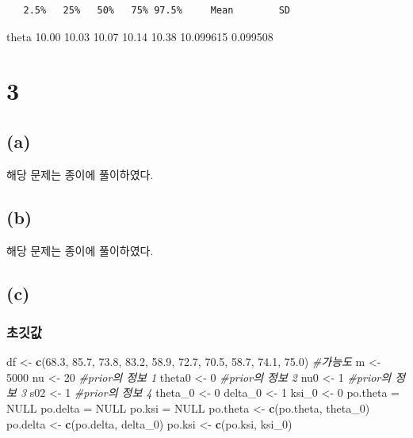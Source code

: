 \documentclass[
]{article}
\newenvironment{Shaded}{\begin{snugshade}}{\end{snugshade}}
\newcommand{\CommentTok}[1]{\textcolor[rgb]{0.56,0.35,0.01}{\textit{#1}}}
\newcommand{\ConstantTok}[1]{\textcolor[rgb]{0.56,0.35,0.01}{#1}}
\newcommand{\DecValTok}[1]{\textcolor[rgb]{0.00,0.00,0.81}{#1}}
\newcommand{\FloatTok}[1]{\textcolor[rgb]{0.00,0.00,0.81}{#1}}
\newcommand{\FunctionTok}[1]{\textcolor[rgb]{0.13,0.29,0.53}{\textbf{#1}}}
\newcommand{\NormalTok}[1]{#1}
\newcommand{\OtherTok}[1]{\textcolor[rgb]{0.56,0.35,0.01}{#1}}
\begin{document}
\begin{verbatim}
   2.5%   25%   50%   75% 97.5%     Mean        SD
\end{verbatim}

theta 10.00 10.03 10.07 10.14 10.38 10.099615 0.099508

\section{3}\label{section-3}

\subsection{(a)}\label{a-3}

해당 문제는 종이에 풀이하였다.

\subsection{(b)}\label{b-3}

해당 문제는 종이에 풀이하였다.

\subsection{(c)}\label{c-3}

\subsubsection{초깃값}\label{uxcd08uxae43uxac12}

\begin{Shaded}
\begin{Highlighting}[]
\NormalTok{df }\OtherTok{\textless{}{-}} \FunctionTok{c}\NormalTok{(}\FloatTok{68.3}\NormalTok{, }\FloatTok{85.7}\NormalTok{, }\FloatTok{73.8}\NormalTok{, }\FloatTok{83.2}\NormalTok{, }\FloatTok{58.9}\NormalTok{, }\FloatTok{72.7}\NormalTok{, }\FloatTok{70.5}\NormalTok{, }\FloatTok{58.7}\NormalTok{, }\FloatTok{74.1}\NormalTok{, }\FloatTok{75.0}\NormalTok{) }\CommentTok{\#가능도}
\NormalTok{m }\OtherTok{\textless{}{-}} \DecValTok{5000}
\NormalTok{nu }\OtherTok{\textless{}{-}} \DecValTok{20} \CommentTok{\#prior의 정보 1}
\NormalTok{theta0 }\OtherTok{\textless{}{-}} \DecValTok{0} \CommentTok{\#prior의 정보 2}
\NormalTok{nu0 }\OtherTok{\textless{}{-}} \DecValTok{1} \CommentTok{\#prior의 정보 3}
\NormalTok{s02 }\OtherTok{\textless{}{-}} \DecValTok{1} \CommentTok{\#prior의 정보 4}
\NormalTok{theta\_0 }\OtherTok{\textless{}{-}} \DecValTok{0}
\NormalTok{delta\_0 }\OtherTok{\textless{}{-}} \DecValTok{1}
\NormalTok{ksi\_0 }\OtherTok{\textless{}{-}} \DecValTok{0}
\NormalTok{po.theta }\OtherTok{=} \ConstantTok{NULL}
\NormalTok{po.delta }\OtherTok{=} \ConstantTok{NULL}
\NormalTok{po.ksi }\OtherTok{=} \ConstantTok{NULL}
\NormalTok{po.theta }\OtherTok{\textless{}{-}} \FunctionTok{c}\NormalTok{(po.theta, theta\_0)}
\NormalTok{po.delta }\OtherTok{\textless{}{-}} \FunctionTok{c}\NormalTok{(po.delta, delta\_0)}
\NormalTok{po.ksi }\OtherTok{\textless{}{-}} \FunctionTok{c}\NormalTok{(po.ksi, ksi\_0)}
\end{Highlighting}
\end{Shaded}
\end{document}
